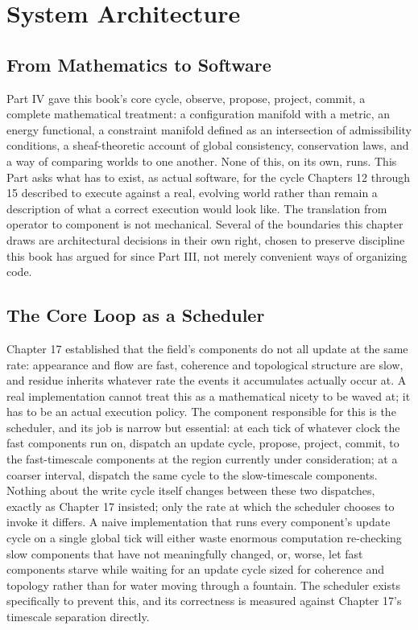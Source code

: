 \chapter{System Architecture}

\section{From Mathematics to Software}

Part IV gave this book's core cycle, observe, propose, project, commit, a complete mathematical treatment: a configuration manifold with a metric, an energy functional, a constraint manifold defined as an intersection of admissibility conditions, a sheaf-theoretic account of global consistency, conservation laws, and a way of comparing worlds to one another. None of this, on its own, runs. This Part asks what has to exist, as actual software, for the cycle Chapters 12 through 15 described to execute against a real, evolving world rather than remain a description of what a correct execution would look like. The translation from operator to component is not mechanical. Several of the boundaries this chapter draws are architectural decisions in their own right, chosen to preserve discipline this book has argued for since Part III, not merely convenient ways of organizing code.

\section{The Core Loop as a Scheduler}

Chapter 17 established that the field's components do not all update at the same rate: appearance and flow are fast, coherence and topological structure are slow, and residue inherits whatever rate the events it accumulates actually occur at. A real implementation cannot treat this as a mathematical nicety to be waved at; it has to be an actual execution policy. The component responsible for this is the scheduler, and its job is narrow but essential: at each tick of whatever clock the fast components run on, dispatch an update cycle, propose, project, commit, to the fast-timescale components at the region currently under consideration; at a coarser interval, dispatch the same cycle to the slow-timescale components. Nothing about the write cycle itself changes between these two dispatches, exactly as Chapter 17 insisted; only the rate at which the scheduler chooses to invoke it differs. A naive implementation that runs every component's update cycle on a single global tick will either waste enormous computation re-checking slow components that have not meaningfully changed, or, worse, let fast components starve while waiting for an update cycle sized for coherence and topology rather than for water moving through a fountain. The scheduler exists specifically to prevent this, and its correctness is measured against Chapter 17's timescale separation directly.

